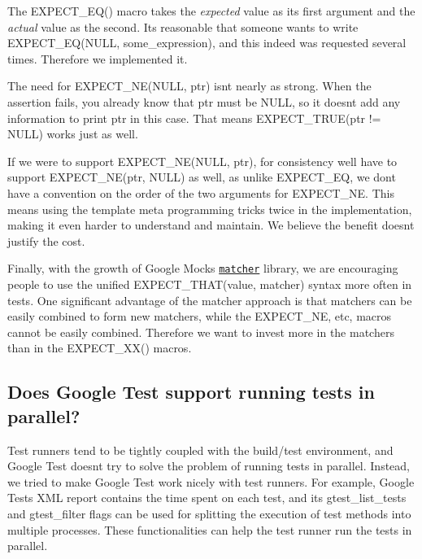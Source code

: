 The {\ttfamily E\+X\+P\+E\+C\+T\+\_\+\+E\+Q()} macro takes the {\itshape expected} value as its first argument and the {\itshape actual} value as the second. It\textquotesingle{}s reasonable that someone wants to write {\ttfamily E\+X\+P\+E\+C\+T\+\_\+\+E\+Q(\+N\+U\+L\+L, some\+\_\+expression)}, and this indeed was requested several times. Therefore we implemented it.

The need for {\ttfamily E\+X\+P\+E\+C\+T\+\_\+\+N\+E(\+N\+U\+L\+L, ptr)} isn\textquotesingle{}t nearly as strong. When the assertion fails, you already know that {\ttfamily ptr} must be {\ttfamily N\+U\+LL}, so it doesn\textquotesingle{}t add any information to print ptr in this case. That means {\ttfamily E\+X\+P\+E\+C\+T\+\_\+\+T\+R\+UE(ptr != N\+U\+LL)} works just as well.

If we were to support {\ttfamily E\+X\+P\+E\+C\+T\+\_\+\+N\+E(\+N\+U\+L\+L, ptr)}, for consistency we\textquotesingle{}ll have to support {\ttfamily E\+X\+P\+E\+C\+T\+\_\+\+N\+E(ptr, N\+U\+L\+L)} as well, as unlike {\ttfamily E\+X\+P\+E\+C\+T\+\_\+\+EQ}, we don\textquotesingle{}t have a convention on the order of the two arguments for {\ttfamily E\+X\+P\+E\+C\+T\+\_\+\+NE}. This means using the template meta programming tricks twice in the implementation, making it even harder to understand and maintain. We believe the benefit doesn\textquotesingle{}t justify the cost.

Finally, with the growth of Google Mock\textquotesingle{}s \href{../../googlemock/docs/CookBook.md#using-matchers-in-google-test-assertions}{\tt matcher} library, we are encouraging people to use the unified {\ttfamily E\+X\+P\+E\+C\+T\+\_\+\+T\+H\+A\+T(value, matcher)} syntax more often in tests. One significant advantage of the matcher approach is that matchers can be easily combined to form new matchers, while the {\ttfamily E\+X\+P\+E\+C\+T\+\_\+\+NE}, etc, macros cannot be easily combined. Therefore we want to invest more in the matchers than in the {\ttfamily E\+X\+P\+E\+C\+T\+\_\+\+X\+X()} macros.

\subsection*{Does Google Test support running tests in parallel?}

Test runners tend to be tightly coupled with the build/test environment, and Google Test doesn\textquotesingle{}t try to solve the problem of running tests in parallel. Instead, we tried to make Google Test work nicely with test runners. For example, Google Test\textquotesingle{}s X\+ML report contains the time spent on each test, and its {\ttfamily gtest\+\_\+list\+\_\+tests} and {\ttfamily gtest\+\_\+filter} flags can be used for splitting the execution of test methods into multiple processes. These functionalities can help the test runner run the tests in parallel.

